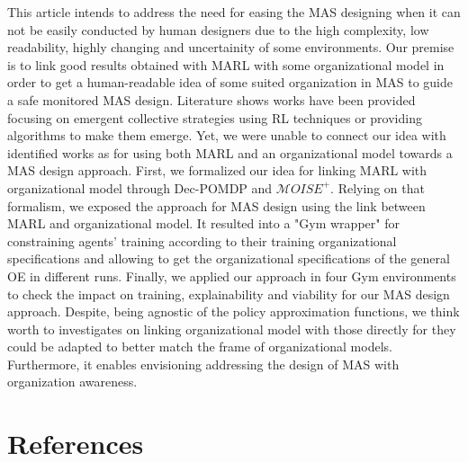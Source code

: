 \documentclass[runningheads]{llncs}
\begin{document}


This article intends to address the need for easing the MAS designing when it can not be easily conducted by human designers due to the high complexity, low readability, highly changing and uncertainity of some environments. Our premise is to link good results obtained with MARL with some organizational model in order to get a human-readable idea of some suited organization in MAS to guide a safe monitored MAS design. Literature shows works have been provided focusing on emergent collective strategies using RL techniques or providing algorithms to make them emerge. Yet, we were unable to connect our idea with identified works as for using both MARL and an organizational model towards a MAS design approach. First, we formalized our idea for linking MARL with organizational model through Dec-POMDP and $\mathcal{M}OISE^+$. Relying on that formalism, we exposed the approach for MAS design using the link between MARL and organizational model. It resulted into a "Gym wrapper" for constraining agents' training according to their training organizational specifications and allowing to get the organizational specifications of the general OE in different runs. Finally, we applied our approach in four Gym environments to check the impact on training, explainability and viability for our MAS design approach. Despite, being agnostic of the policy approximation functions, we think worth to investigates on linking organizational model with those directly for they could be adapted to better match the frame of organizational models. Furthermore, it enables envisioning addressing the design of MAS with organization awareness.


%
%
% 
% 
%
\section*{References}

% 



\end{document}
